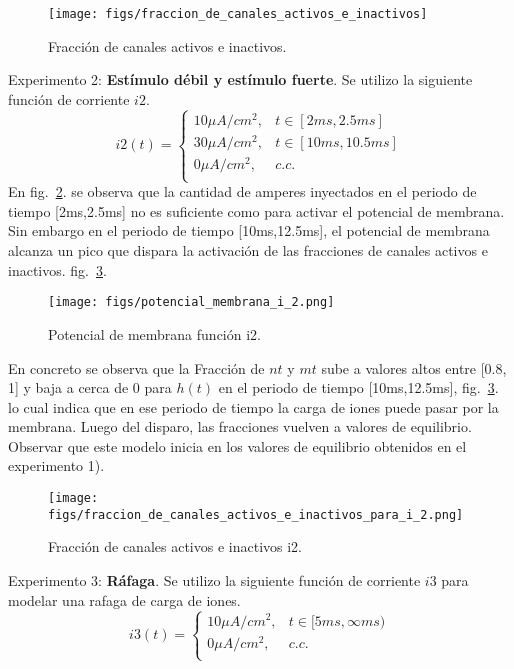 \documentclass[aps,prl,twocolumn,groupedaddress]{revtex4-2}
\begin{document}
\begin{figure}[h!]
\centering
\texttt{[image: figs/fraccion\_de\_canales\_activos\_e\_inactivos]}
\caption{Fracción de canales activos e inactivos. \label{fig2}}
\end{figure}


Experimento 2: \textbf{Estímulo débil y estímulo fuerte}. Se utilizo la siguiente función de corriente $i2$.
$$
i2(t) = \left\{
\begin{array}{ll}
10 \mu A/cm^2, & t\in [2ms,2.5ms] \\
30 \mu A/cm^2, & t\in [10ms,10.5ms] \\
0 \mu A/cm^2, & c.c. \\
\end{array}
\right.
$$
En fig.~\ref{fig3}. se observa  que la cantidad de amperes inyectados en el periodo de tiempo [2ms,2.5ms]  no es suficiente como para activar el potencial de membrana. Sin embargo en el periodo de tiempo [10ms,12.5ms], el potencial de membrana alcanza un pico que  dispara la activación de las fracciones de canales activos e inactivos.  fig.~\ref{fig4}.

\begin{figure}[h!]
\centering
\texttt{[image: figs/potencial\_membrana\_i\_2.png]}
\caption{Potencial de membrana función i2. \label{fig3}}
\end{figure}

En concreto se observa que la Fracción de $nt$ y $mt$ sube a valores altos entre [0.8, 1] y baja a cerca de  0 para $h(t)$ en el periodo de tiempo [10ms,12.5ms],
fig.~\ref{fig4}. lo cual indica que en ese periodo de tiempo la carga de iones puede pasar por la membrana.
Luego del disparo, las fracciones vuelven a valores de equilibrio.
Observar que este modelo inicia en los valores de equilibrio obtenidos en el experimento 1).\newline


\begin{figure}[h!]
\centering
\texttt{[image: figs/fraccion\_de\_canales\_activos\_e\_inactivos\_para\_i\_2.png]}
\caption{Fracción de canales activos e inactivos i2. \label{fig4}}
\end{figure}

Experimento 3: \textbf{Ráfaga}. Se utilizo la siguiente función de corriente $i3$ para modelar una rafaga de carga de iones.
$$
i3(t) = \left\{
\begin{array}{ll}
10 \mu A/cm^2, & t\in [5ms,\infty ms) \\
0 \mu A/cm^2, & c.c. \\
\end{array}
\right.
$$
\end{document}
